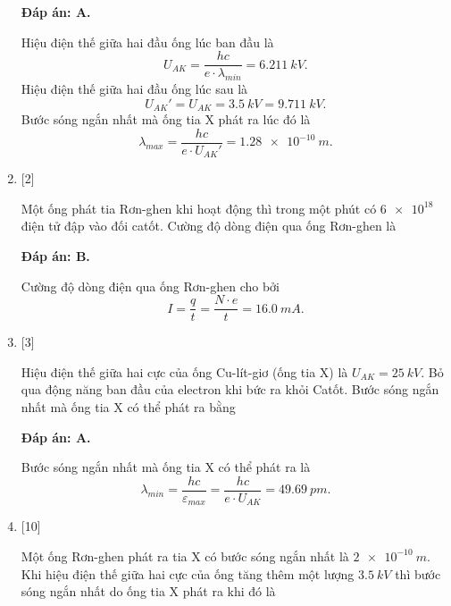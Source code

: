 \begin{enumerate}[label=\bfseries Câu \arabic*:]
\loigiai
{		\textbf{Đáp án: A.}

Hiệu điện thế giữa hai đầu ống lúc ban đầu là
$$
U_{AK} = \dfrac{hc}{e\cdot \lambda_{min}} = \SI{6,211}{kV}.
$$
Hiệu điện thế giữa hai đầu ống lúc sau là
$$
U_{AK}' = U_{AK} = \SI{3,5}{kV} = \SI{9,711}{kV}.
$$
Bước sóng ngắn nhất mà ống tia X phát ra lúc đó là
$$
\lambda_{max} = \dfrac{hc}{e \cdot U_{AK}'} = \SI{1,28e-10}{m}.
$$
}



	\item {} [2]
	\cauhoi
	{Một ống phát tia Rơn-ghen khi hoạt động thì trong một phút có $\num{6e18}$ điện tử đập vào đối catốt. Cường độ dòng điện qua ống Rơn-ghen là
	}
	
	\loigiai
	{		\textbf{Đáp án: B.}
		
		Cường độ dòng điện qua ống Rơn-ghen cho bởi
		$$
		I = \dfrac{q}{t} = \dfrac{N\cdot e}{t} = \SI{16,0}{mA}.
		$$
	}
	
	\item {} [3]
	\cauhoi
	{Hiệu điện thế giữa hai cực của ống Cu-lít-giơ (ống tia X) là $U_{AK} = \SI{25}{kV}$. Bỏ qua động năng ban đầu của electron khi bức ra khỏi Catốt. Bước sóng ngắn nhất mà ống tia X có thể phát ra bằng
	}
	
	\loigiai
	{		\textbf{Đáp án: A.}
		
		Bước sóng ngắn nhất mà ống tia X có thể phát ra là
		$$
		\lambda_{min} = \dfrac{hc}{\varepsilon_{max}} = \dfrac{hc}{e \cdot U_{AK}} = \SI{49,69}{pm}.
		$$
	}
	
	\item {} [10]
	\cauhoi
	{Một ống Rơn-ghen phát ra tia X có bước sóng ngắn nhất là $\SI{2e-10}{m}$. Khi hiệu điện thế giữa hai cực của ống tăng thêm một lượng $\SI{3,5}{kV}$ thì bước sóng ngắn nhất do ống tia X phát ra khi đó là
	}
	

\end{enumerate}
